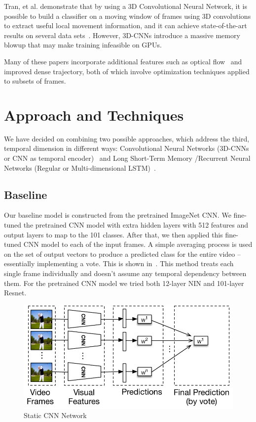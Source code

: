 Tran, et al. demonstrate that by using a 3D Convolutional Neural Network, it is possible to build a classifier on a moving window of frames using 3D convolutions to extract useful local movement information, and it can achieve state-of-the-art results on several data sets~\cite{stf}. However, 3D-CNNs introduce a massive memory blowup that may make training infeasible on GPUs.

Many of these papers incorporate additional features such as optical flow~\cite{brox} and improved dense trajectory, both of which involve optimization techniques applied to subsets of frames. 

\section{Approach and Techniques}
We have decided on combining two possible approaches, which address
the third, temporal dimension in different ways: Convolutional Neural
Networks (3D-CNNs or CNN as temporal encoder)~\cite{stf,cnnvid,cnnMNLS} and Long
Short-Term Memory /Recurrent Neural Networks (Regular or Multi-dimensional LSTM)~\cite{ltrcn}. 

\subsection{Baseline}
Our baseline model is constructed from the pretrained ImageNet CNN. We fine-tuned the pretrained CNN model with extra hidden layers with 512 features and output layers to map to the 101 classes. After that, we then applied this fine-tuned CNN model to each of the input frames. A simple averaging process is used on the set of output vectors to produce a predicted class for the entire video -- essentially implementing a vote. This is shown in~. This method treats each single frame individually and doesn't assume any temporal dependency between them. For the pretrained CNN model we tried both 12-layer NIN and 101-layer Resnet.
\begin{figure}
  \centering
  \includegraphics[width=1.0\linewidth]{figs/cnn}
  \caption{Static CNN Network}
  \label{fig:cnn}
\end{figure}

